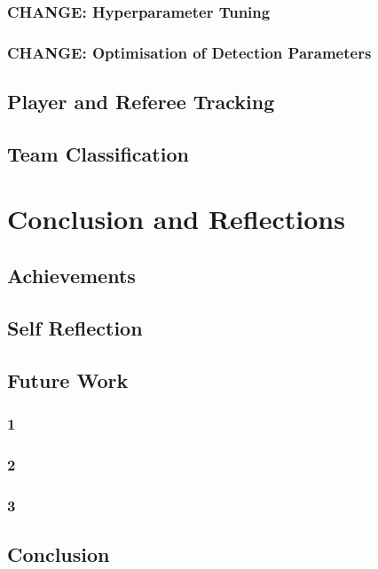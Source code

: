 \documentclass[12pt, letterpaper]{article}
\begin{document}
\subsubsection{\textbf{CHANGE}: Hyperparameter Tuning}
\subsubsection{\textbf{CHANGE}: Optimisation of Detection Parameters}
\subsection{Player and Referee Tracking}
\subsection{Team Classification}
\newpage

\section{Conclusion and Reflections}

\subsection{Achievements}
\subsection{Self Reflection}
\subsection{Future Work}
\subsubsection{1}
\subsubsection{2}
\subsubsection{3}
\subsection{Conclusion}
\newpage


\end{document}
